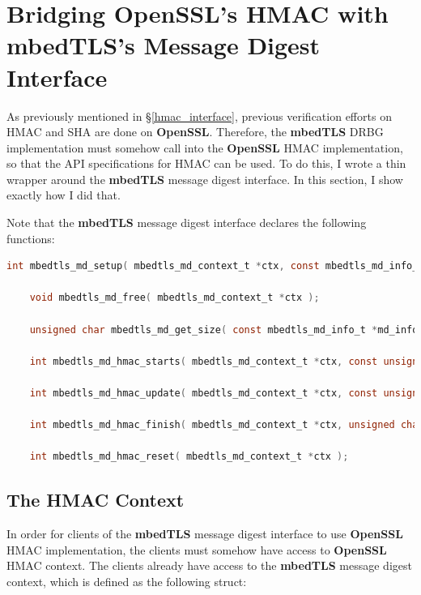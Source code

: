 \documentclass[pageno]{jpaper}
\newcommand{\stdtitle}[1]{\textbf{#1}}
\begin{document}



\clearpage
\appendix
\appendixpage
\section{Bridging OpenSSL’s HMAC with mbedTLS’s Message Digest Interface} \label{appendix_hmac}

As previously mentioned in \S \ref{hmac_interface}, previous verification efforts on HMAC and SHA are done on \stdtitle{OpenSSL}. Therefore, the \stdtitle{mbedTLS} DRBG implementation must somehow call into the \stdtitle{OpenSSL} HMAC implementation, so that the API specifications for HMAC can be used. To do this, I wrote a thin wrapper around the \stdtitle{mbedTLS} message digest interface. In this section, I show exactly how I did that.

Note that the \stdtitle{mbedTLS} message digest interface declares the following functions:

\begin{lstlisting}[language=C]
    int mbedtls_md_setup( mbedtls_md_context_t *ctx, const mbedtls_md_info_t *md_info, int hmac );

    void mbedtls_md_free( mbedtls_md_context_t *ctx );

    unsigned char mbedtls_md_get_size( const mbedtls_md_info_t *md_info );

    int mbedtls_md_hmac_starts( mbedtls_md_context_t *ctx, const unsigned char *key, size_t keylen );

    int mbedtls_md_hmac_update( mbedtls_md_context_t *ctx, const unsigned char *input, size_t ilen );

    int mbedtls_md_hmac_finish( mbedtls_md_context_t *ctx, unsigned char *output);

    int mbedtls_md_hmac_reset( mbedtls_md_context_t *ctx );
\end{lstlisting}

\subsection{The HMAC Context}

In order for clients of the \stdtitle{mbedTLS} message digest interface to use \stdtitle{OpenSSL} HMAC implementation, the clients must somehow have access to \stdtitle{OpenSSL} HMAC context. The clients already have access to the \stdtitle{mbedTLS} message digest context, which is defined as the following struct:
\end{document}
